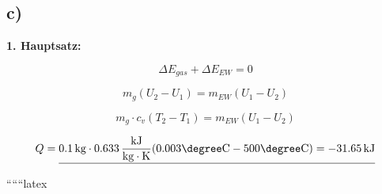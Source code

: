 

\subsection*{c)}

\textbf{1. Hauptsatz:}

\[
\Delta E_{gas} + \Delta E_{EW} = 0
\]

\[
m_g (U_2 - U_1) = m_{EW} (U_1 - U_2)
\]

\[
m_g \cdot c_v (T_2 - T_1) = m_{EW} (U_1 - U_2)
\]

\[
Q = \underline{0.1 \, \text{kg} \cdot 0.633 \, \frac{\text{kJ}}{\text{kg} \cdot \text{K}} (0.003 \degree \text{C} - 500 \degree \text{C}) = -31.65 \, \text{kJ}}
\]

``````latex